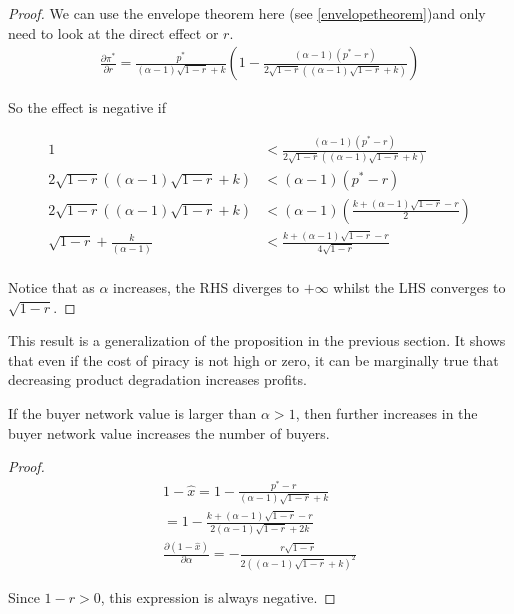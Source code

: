 \begin{proof}
We can use the envelope theorem here (see \ref{envelopetheorem})and only need to look at the direct effect or $r$.
\begin{align*}
\frac{\partial \pi^* }{\partial r}
=
\frac{p^*}{(\alpha-1) \sqrt{1-r}+k} \left(1-\frac{(\alpha-1) (p^*-r)}{2 \sqrt{1-r} \left((\alpha-1) \sqrt{1-r}+k\right)}\right)
\end{align*}

So the effect is negative if 

\begin{align*}
1&<\frac{(\alpha-1) (p^*-r)}{2 \sqrt{1-r} \left((\alpha-1) \sqrt{1-r}+k\right)} \\
2 \sqrt{1-r} \left((\alpha-1) \sqrt{1-r}+k\right) &<(\alpha-1) (p^*-r) \\
2 \sqrt{1-r} \left((\alpha-1) \sqrt{1-r}+k\right) &<(\alpha-1) \left(\frac{k+ (\alpha-1)\sqrt{ 1 -r }-r}{2} \right) \\
\sqrt{1-r}+ \frac{k}{(\alpha-1) }  &< \frac{k+ (\alpha-1)\sqrt{ 1 -r }-r}{4 \sqrt{1-r} } \\
\end{align*}

Notice that as $\alpha$ increases, the RHS diverges to $+\infty$ whilst the LHS converges to $\sqrt{1-r}$.  
\end{proof}

This result is a generalization of the proposition in the previous section. It shows that even if the cost of piracy is not high or zero, it can be marginally true that decreasing product degradation increases profits. 

\begin{proposition}
If the buyer network value is larger than $\alpha>1$, then further increases in the buyer network value increases the number of buyers. 
\end{proposition}

\begin{proof}
\begin{align*}
1 - \hat{x}= 1 - \frac{p^*-r}{(\alpha - 1) \sqrt{1-r} +k} \\
= 1 - \frac{k+ (\alpha-1)\sqrt{ 1 -r }-r}{2(\alpha - 1) \sqrt{1-r} +2k} \\
\frac{\partial (1 - \hat{x})}{\partial \alpha}
=-\frac{ r\sqrt{1-r} }{2 \left((\alpha-1) \sqrt{1-r}+k\right)^2} 
\end{align*}

Since $1-r>0$, this expression is always negative. 

\end{proof}

